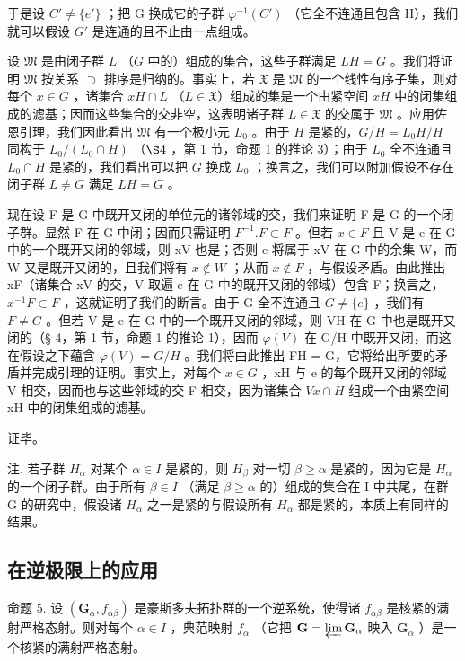 于是设 \(C' \neq \{e'\}\) ；把 G 换成它的子群 \(\varphi^{-1}(C')\) （它全不连通且包含 H），我们就可以假设 \(G'\) 是连通的且不止由一点组成。

设 \(\mathfrak{M}\) 是由闭子群 \(L\) （\(G\) 中的）组成的集合，这些子群满足 \(LH = G\) 。我们将证明 \(\mathfrak{M}\) 按关系 \(\supset\) 排序是归纳的。事实上，若 \(\mathfrak{X}\) 是 \(\mathfrak{M}\) 的一个线性有序子集，则对每个 \(x \in G\) ，诸集合 \(xH \cap L\) （\(L \in \mathfrak{X}\)）组成的集是一个由紧空间 \(xH\) 中的闭集组成的滤基；因而这些集合的交非空，这表明诸子群 \(L \in \mathfrak{X}\) 的交属于 \(\mathfrak{M}\) 。应用佐恩引理，我们因此看出 \(\mathfrak{M}\) 有一个极小元 \(L_0\) 。由于 \(H\) 是紧的，\(G/H = L_0H/H\) 同构于 \(L_0/(L_0 \cap H)\) （\(\S 4\) ，第 1 节，命题 1 的推论 3）；由于 \(L_0\) 全不连通且 \(L_0 \cap H\) 是紧的，我们看出可以把 \(G\) 换成 \(L_0\) ；换言之，我们可以附加假设不存在闭子群 \(L \neq G\) 满足 \(LH = G\) 。

现在设 F 是 G 中既开又闭的单位元的诸邻域的交，我们来证明 F 是 G 的一个闭子群。显然 F 在 G 中闭；因而只需证明 \(F^{-1}.F \subset F\) 。但若 \(x \in F\) 且 V 是 e 在 G 中的一个既开又闭的邻域，则 xV 也是；否则 e 将属于 xV 在 G 中的余集 W，而 W 又是既开又闭的，且我们将有 \(x \notin W\) ；从而 \(x \notin F\) ，与假设矛盾。由此推出 xF（诸集合 xV 的交，V 取遍 e 在 G 中的既开又闭的邻域）包含 F；换言之，\(x^{-1}F \subset F\) ，这就证明了我们的断言。由于 G 全不连通且 \(G \neq \{e\}\) ，我们有 \(F \neq G\) 。但若 V 是 e 在 G 中的一个既开又闭的邻域，则 VH 在 G 中也是既开又闭的（§ 4，第 1 节，命题 1 的推论 1），因而 \(\varphi(V)\) 在 G/H 中既开又闭，而这在假设之下蕴含 \(\varphi(V) = G/H\) 。我们将由此推出 FH = G，它将给出所要的矛盾并完成引理的证明。事实上，对每个 \(x \in G\) ，xH 与 e 的每个既开又闭的邻域 V 相交，因而也与这些邻域的交 F 相交，因为诸集合 \(Vx \cap H\) 组成一个由紧空间 xH 中的闭集组成的滤基。

证毕。

注. 若子群 \(H_{\alpha}\) 对某个 \(\alpha \in I\) 是紧的，则 \(H_{\beta}\) 对一切 \(\beta \geqslant \alpha\) 是紧的，因为它是 \(H_{\alpha}\) 的一个闭子群。由于所有 \(\beta \in I\) （满足 \(\beta \geqslant \alpha\) 的）组成的集合在 I 中共尾，在群 G 的研究中，假设诸 \(H_{\alpha}\) 之一是紧的与假设所有 \(H_{\alpha}\) 都是紧的，本质上有同样的结果。

\subsection{在逆极限上的应用}

命题 5. 设 \((\mathbf{G}_{\alpha}, f_{\alpha \beta})\) 是豪斯多夫拓扑群的一个逆系统，使得诸 \(f_{\alpha \beta}\) 是核紧的满射严格态射。则对每个 \(\alpha \in I\) ，典范映射 \(f_{\alpha}\) （它把 \(\mathbf{G} = \varprojlim \mathbf{G}_{\alpha}\) 映入 \(\mathbf{G}_{\alpha}\) ）是一个核紧的满射严格态射。

